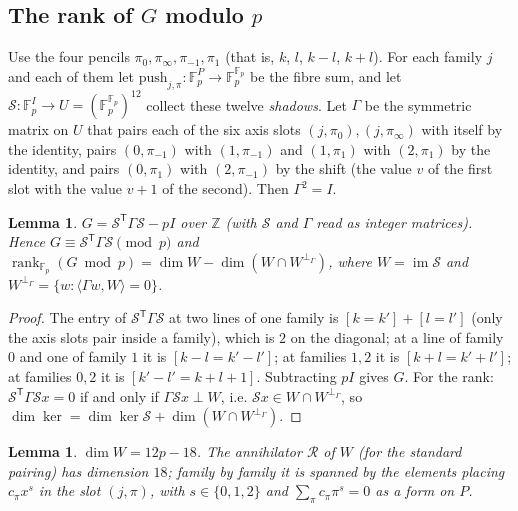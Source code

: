 \documentclass[11pt]{article}
\newtheorem{lemma}[theorem]{Lemma}
\theoremstyle{definition}
\theoremstyle{remark}
\newcommand{\Z}{\mathbb{Z}}
\newcommand{\F}{\mathbb{F}}
\begin{document}
\subsection{The rank of \texorpdfstring{$G$}{G} modulo \texorpdfstring{$p$}{p}}\label{sec:rank}

Use the four pencils $\pi_0,\pi_\infty,\pi_{-1},\pi_1$ (that is, $k$, $l$, $k-l$, $k+l$). For each family $j$ and each of them let $\mathrm{push}_{j,\pi}:\F_p^P\to\F_p^{\F_p}$ be the fibre sum, and let $\mathcal S:\F_p^I\to U=(\F_p^{\F_p})^{12}$ collect these twelve \emph{shadows}. Let $\Gamma$ be the symmetric matrix on $U$ that pairs each of the six axis slots $(j,\pi_0),(j,\pi_\infty)$ with itself by the identity, pairs $(0,\pi_{-1})$ with $(1,\pi_{-1})$ and $(1,\pi_1)$ with $(2,\pi_1)$ by the identity, and pairs $(0,\pi_1)$ with $(2,\pi_{-1})$ by the shift (the value $v$ of the first slot with the value $v+1$ of the second). Then $\Gamma^2=I$.

\begin{lemma}\label{lem:shadow}
$G=\mathcal S^{\mathsf T}\Gamma \mathcal S-pI$ over $\Z$ (with $\mathcal S$ and $\Gamma$ read as integer matrices). Hence $G\equiv \mathcal S^{\mathsf T}\Gamma \mathcal S\pmod p$ and $\operatorname{rank}_{\F_p}(G\bmod p)=\dim W-\dim(W\cap W^{\perp_\Gamma})$, where $W=\operatorname{im}\mathcal S$ and $W^{\perp_\Gamma}=\{w:\langle\Gamma w,W\rangle=0\}$.
\end{lemma}

\begin{proof}
The entry of $\mathcal S^{\mathsf T}\Gamma \mathcal S$ at two lines of one family is $[k=k']+[l=l']$ (only the axis slots pair inside a family), which is $2$ on the diagonal; at a line of family $0$ and one of family $1$ it is $[k-l=k'-l']$; at families $1,2$ it is $[k+l=k'+l']$; at families $0,2$ it is $[k'-l'=k+l+1]$. Subtracting $pI$ gives $G$. For the rank: $\mathcal S^{\mathsf T}\Gamma \mathcal Sx=0$ if and only if $\Gamma \mathcal Sx\perp W$, i.e. $\mathcal Sx\in W\cap W^{\perp_\Gamma}$, so $\dim\ker=\dim\ker \mathcal S+\dim(W\cap W^{\perp_\Gamma})$.
\end{proof}

\begin{lemma}\label{lem:W}
$\dim W=12p-18$. The annihilator $\mathcal R$ of $W$ (for the standard pairing) has dimension $18$; family by family it is spanned by the elements placing $c_\pi x^s$ in the slot $(j,\pi)$, with $s\in\{0,1,2\}$ and $\sum_\pi c_\pi\pi^s=0$ as a form on $P$.
\end{lemma}
\end{document}
